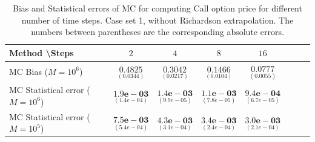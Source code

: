 \documentclass[11pt]{article}
\begin{document}
\begin{table}[h!]
	\centering
	\begin{tabular}{l*{6}{c}r}
		Method \textbackslash  Steps            & $2$ & $4$ & $8$ & $16$  \\
		\hline
		MC Bias ($M=10^6$)   & 	$ \underset{( 0.0344)}{\mathbf{0.4825}}$  & $\underset{( 0.0217)}{\mathbf{0.3042}}$  & $\underset{(0.0104)}{\mathbf{0.1466}}$ & $\underset{( 0.0055)}{\mathbf{0.0777}}$\\ 
		
		MC Statistical error ($M=10^6$)  &  $\underset{(  1.4e-04)} {\mathbf{1.9e-03}}$  & $\underset{(9.9e-05)} {\mathbf{1.4e-03}}$  & $\underset{(7.8e-05)} {\mathbf{ 1.1e-03}}$ & $\underset{( 6.7e-05)} {\mathbf{9.4e-04}}$	\\
		MC Statistical error ($M=10^5$)  &  $\underset{(  5.4e-04)} {\mathbf{7.5e-03}}$  & $\underset{(3.1e-04)} {\mathbf{4.3e-03}}$  & $\underset{(2.4e-04)} {\mathbf{ 3.4e-03}}$ & $\underset{( 2.1e-04)} {\mathbf{3.0e-03}}$	\\
		
		\hline
	\end{tabular}
	\caption{Bias and Statistical errors of MC  for computing Call option price  for different number of time steps. Case set 1, without Richardson extrapolation. The numbers between parentheses are the corresponding absolute errors.}
	\label{Bias and Statistical errors of MC ($M=10^6$)  for computing Call option price  for different number of time steps. Case set 1, without Richardson extrapolation. The numbers between parentheses are the corresponding absolute errors.}
\end{table}
\end{document}
